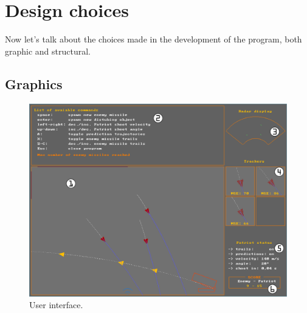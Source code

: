\documentclass[notitlepage,a4paper,11pt]{article} %
\begin{document}
\newpage
\section{Design choices}

	Now let's talk about the choices made in the development of the program, both graphic and structural.

	\subsection{Graphics}

		\begin{figure}[hb]
			\includegraphics[width=\textwidth]{window_enumerated}
			\caption{User interface.}
		\end{figure}
\end{document}
